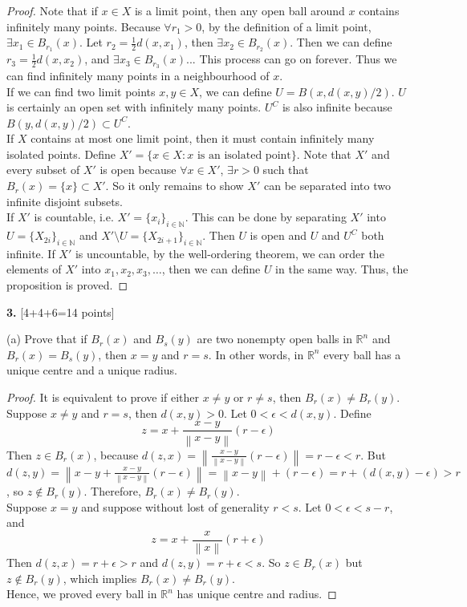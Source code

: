 \documentclass[11pt,a4paper]{amsart}
\newcommand{\norm}[1]{\left\lVert#1\right\rVert}
\def\R{{\mathbb R}}
\def\N{{\mathbb N}}
\begin{document}
\begin{proof}
  Note that if $x \in X$ is a limit point, then any open ball around $x$ contains infinitely many points.
  Because $\forall r_1>0$, by the definition of a limit point, $\exists x_1 \in B_{r_1}(x)$.
  Let $r_2 = \frac{1}{2}d(x,x_1)$, then $\exists x_2 \in B_{r_2}(x)$.
  Then we can define $r_3 = \frac{1}{2}d(x,x_2)$, and $\exists x_3 \in B_{r_3}(x)$...
  This process can go on forever. Thus we can find infinitely many points in a neighbourhood of $x$.\\

  If we can find two limit points $x,y \in X$, we can define $U = B(x, d(x,y)/2)$.
  $U$ is certainly an open set with infinitely many points.
  $U^C$ is also infinite because $B(y, d(x,y)/2) \subset U^C$. \\

  If $X$ contains at most one limit point, then it must contain infinitely many isolated points.
  Define $X' = \{ x\in X: x \textrm{ is an isolated point}\}$.
  Note that $X'$ and every subset of $X'$ is open because
  $\forall x \in X'$, $\exists r>0$ such that $B_r(x)=\{x\} \subset X'$.
  So it only remains to show $X'$ can be separated into two infinite disjoint subsets.\\

  If $X'$ is countable, i.e. $X' = \{x_i\}_{i\in\N}$. This can be done by separating $X'$ into
  $U = \{ X_{2i}\}_{i\in\N}$ and $X'\setminus U = \{ X_{2i+1}\}_{i\in\N}$.
  Then $U$ is open and $U$ and $U^C$ both infinite.
  If $X'$ is uncountable, by the well-ordering theorem, we can order the elements of $X'$
  into $x_1, x_2, x_3, \dots$, then we can define $U$ in the same way.
  Thus, the proposition is proved.
\end{proof}

\bigskip


{\bf 3.} [4+4+6=14 points]

(a) Prove that if $B_r(x)$ and $B_s(y)$ are two nonempty open balls in $\R^n$ and $B_r(x)=B_s(y)$,
then $x=y$ and $r=s$. In other words, in $\R^n$ every ball has a unique centre and a unique radius.

\begin{proof}
  It is equivalent to prove if either $x \neq y$ or $r \neq s$, then $B_r(x) \neq B_r(y)$.
  Suppose $x \neq y$ and $r = s$, then $d(x,y)>0$. Let $0 < \epsilon < d(x,y)$. Define
  $$ z = x + \frac{x-y}{\norm{x-y}}(r-\epsilon) $$
  Then $z \in B_r(x)$, because $d(z,x) = \norm{\frac{x-y}{\norm{x-y}}(r-\epsilon)} = r - \epsilon < r$.
  But $d(z,y)= \norm{ x-y + \frac{x-y}{\norm{x-y}}(r-\epsilon) } =\norm{x-y} + (r-\epsilon)=r + (d(x,y)-\epsilon) >r$,
  so $z \notin B_r(y)$. Therefore, $B_r(x) \neq B_r(y)$. \\

  Suppose $x=y$ and suppose without lost of generality $r<s$. Let $0<\epsilon<s-r$, and
  $$ z = x + \frac{x}{\norm{x}}(r+\epsilon) $$
  Then $d(z,x) = r+\epsilon > r$ and $d(z,y)=r+\epsilon < s$. So $z \in B_r(x)$ but $z \notin B_r(y)$,
  which implies $B_r(x) \neq B_r(y)$.\\

  Hence, we proved every ball in $\R^n$ has unique centre and radius.
\end{proof}
\end{document}
